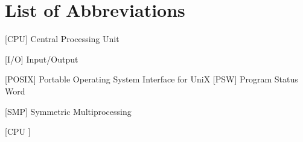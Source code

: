 
\chapter*{List of Abbreviations}

\begin{acronym} [CPU ]


 [CPU] {Central Processing Unit}






 [I/O] {Input/Output}







 [POSIX] {Portable Operating System Interface for UniX}
 [PSW] {Program Status Word}



 [SMP] {Symmetric Multiprocessing}








\end{acronym} [CPU ]
